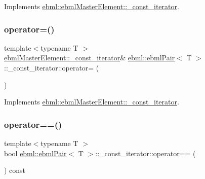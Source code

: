 Implements \mbox{\hyperlink{classebml_1_1ebmlMasterElement_1_1__const__iterator_a439f540325443a3c3a3acdcd8df81553}{ebml\+::ebml\+Master\+Element\+::\+\_\+const\+\_\+iterator}}.

\mbox{\label{classebml_1_1ebmlPair_1_1__const__iterator_a84535e268f7488e9acff8e5d35de4f38}} 
\subsubsection{\texorpdfstring{operator=()}{operator=()}}
{\footnotesize\ttfamily template$<$typename T $>$ \\
\mbox{\hyperlink{classebml_1_1ebmlMasterElement_1_1__const__iterator}{ebml\+Master\+Element\+::\+\_\+const\+\_\+iterator}}\& \mbox{\hyperlink{classebml_1_1ebmlPair}{ebml\+::ebml\+Pair}}$<$ T $>$\+::\+\_\+const\+\_\+iterator\+::operator= (\begin{DoxyParamCaption}\item[{const \mbox{\hyperlink{classebml_1_1ebmlMasterElement_1_1__const__iterator}{ebml\+Master\+Element\+::\+\_\+const\+\_\+iterator}} \&}]{ }\end{DoxyParamCaption})\hspace{0.3cm}{\ttfamily [virtual]}}



Implements \mbox{\hyperlink{classebml_1_1ebmlMasterElement_1_1__const__iterator_a102cf8b36c0d8184680ef15594bb59fb}{ebml\+::ebml\+Master\+Element\+::\+\_\+const\+\_\+iterator}}.

\mbox{\label{classebml_1_1ebmlPair_1_1__const__iterator_a2b9f927f8b57e7db13693581d6592e1e}} 
\subsubsection{\texorpdfstring{operator==()}{operator==()}}
{\footnotesize\ttfamily template$<$typename T $>$ \\
bool \mbox{\hyperlink{classebml_1_1ebmlPair}{ebml\+::ebml\+Pair}}$<$ T $>$\+::\+\_\+const\+\_\+iterator\+::operator== (\begin{DoxyParamCaption}\item[{const \mbox{\hyperlink{classebml_1_1ebmlMasterElement_1_1__const__iterator}{ebml\+Master\+Element\+::\+\_\+const\+\_\+iterator}} \&}]{ }\end{DoxyParamCaption}) const\hspace{0.3cm}{\ttfamily [virtual]}}



